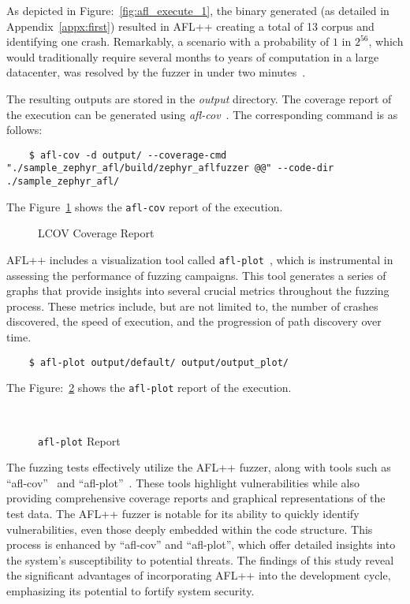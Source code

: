 As depicted in Figure:~\ref{fig:afl_execute_1}, the binary generated
(as detailed in Appendix~\ref{appx:first}) resulted in AFL++ creating a total of
13 corpus and identifying one crash. Remarkably, a scenario with a
probability of \(1\) in \(2^{56}\), which would traditionally
require several months to years of computation in a large datacenter,
was resolved by the fuzzer in under two minutes~\cite{FuzzingE54:online}.

The resulting outputs are stored in the \textit{output} directory.
The coverage report of the execution can be generated using \textit{afl-cov}~\cite{GitHubmr91:online}.
The corresponding command is as follows:

\begin{verbatim}
    $ afl-cov -d output/ --coverage-cmd "./sample_zephyr_afl/build/zephyr_aflfuzzer @@" --code-dir ./sample_zephyr_afl/
\end{verbatim}

The Figure~\ref{fig:afl_cov} shows the \texttt{afl-cov} report of the execution.
\begin{figure}[H]
        \caption{LCOV Coverage Report~\cite{UbuntuMa97:online}}\label{fig:afl_cov}
\end{figure}

AFL++ includes a visualization tool called \texttt{afl-plot}~\cite{AFLFunct92:online},
which is instrumental in assessing the performance of fuzzing campaigns.
This tool generates a series of graphs that provide insights into several
crucial metrics throughout the fuzzing process. These metrics include,
but are not limited to, the number of crashes discovered,
the speed of execution, and the progression of path discovery over time.

\begin{verbatim}
    $ afl-plot output/default/ output/output_plot/
\end{verbatim}

The Figure:~\ref{fig:afl_plot} shows the \texttt{afl-plot} report of the execution.
\begin{figure}[H]
        \caption{\texttt{afl-plot} Report}~\label{fig:afl_plot}
\end{figure}

The fuzzing tests effectively utilize the AFL++ fuzzer, along with tools such as
``afl-cov''~\cite{GitHubmr91:online} and ``afl-plot''~\cite{AFLFunct92:online}.
These tools highlight vulnerabilities while also providing comprehensive
coverage reports and graphical representations of the test data. The AFL++
fuzzer is notable for its ability to quickly identify vulnerabilities, even
those deeply embedded within the code structure. This process is enhanced by
``afl-cov'' and ``afl-plot'', which offer detailed insights into the system's
susceptibility to potential threats. The findings of this study reveal the
significant advantages of incorporating AFL++ into the development cycle,
emphasizing its potential to fortify system security.

